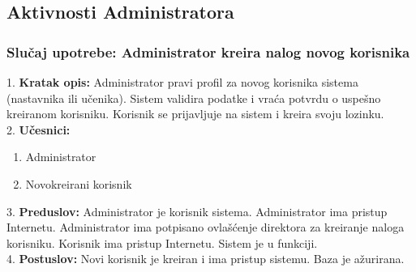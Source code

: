 \documentclass{article}
\begin{document}
\newpage
\subsection{Aktivnosti Administratora}

\subsubsection{Slučaj upotrebe: Administrator kreira nalog novog korisnika} 
1. \textbf{Kratak opis:} Administrator pravi profil za novog korisnika sistema (nastavnika ili učenika). Sistem validira podatke i vraća potvrdu o uspešno kreiranom korisniku. Korisnik se prijavljuje na sistem i kreira svoju lozinku. \\

2. \textbf{Učesnici:}
\begin{enumerate} [label=(\alph*)]
\item Administrator
\item Novokreirani korisnik
\end{enumerate} 

3. \textbf{Preduslov:} Administrator je korisnik sistema. Administrator ima pristup Internetu. Administrator ima potpisano ovlašćenje direktora za kreiranje naloga korisniku. Korisnik ima pristup Internetu. Sistem je u funkciji. \\

4. \textbf{Postuslov:} Novi korisnik je kreiran i ima pristup sistemu. Baza je ažurirana. \\
\end{document}
